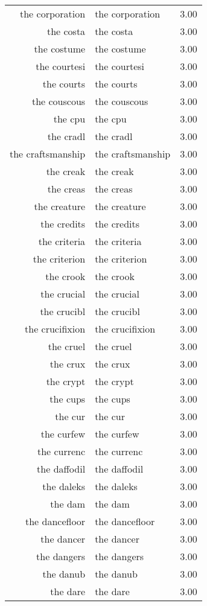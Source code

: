 \begin{table}[ht]
\begin{tabular}{rlr}
  the corporation & the corporation & 3.00 \\ 
  the costa & the costa & 3.00 \\ 
  the costume & the costume & 3.00 \\ 
  the courtesi & the courtesi & 3.00 \\ 
  the courts & the courts & 3.00 \\ 
  the couscous & the couscous & 3.00 \\ 
  the cpu & the cpu & 3.00 \\ 
  the cradl & the cradl & 3.00 \\ 
  the craftsmanship & the craftsmanship & 3.00 \\ 
  the creak & the creak & 3.00 \\ 
  the creas & the creas & 3.00 \\ 
  the creature & the creature & 3.00 \\ 
  the credits & the credits & 3.00 \\ 
  the criteria & the criteria & 3.00 \\ 
  the criterion & the criterion & 3.00 \\ 
  the crook & the crook & 3.00 \\ 
  the crucial & the crucial & 3.00 \\ 
  the crucibl & the crucibl & 3.00 \\ 
  the crucifixion & the crucifixion & 3.00 \\ 
  the cruel & the cruel & 3.00 \\ 
  the crux & the crux & 3.00 \\ 
  the crypt & the crypt & 3.00 \\ 
  the cups & the cups & 3.00 \\ 
  the cur & the cur & 3.00 \\ 
  the curfew & the curfew & 3.00 \\ 
  the currenc & the currenc & 3.00 \\ 
  the daffodil & the daffodil & 3.00 \\ 
  the daleks & the daleks & 3.00 \\ 
  the dam & the dam & 3.00 \\ 
  the dancefloor & the dancefloor & 3.00 \\ 
  the dancer & the dancer & 3.00 \\ 
  the dangers & the dangers & 3.00 \\ 
  the danub & the danub & 3.00 \\ 
  the dare & the dare & 3.00 \\ 

\end{tabular}
\end{table}
